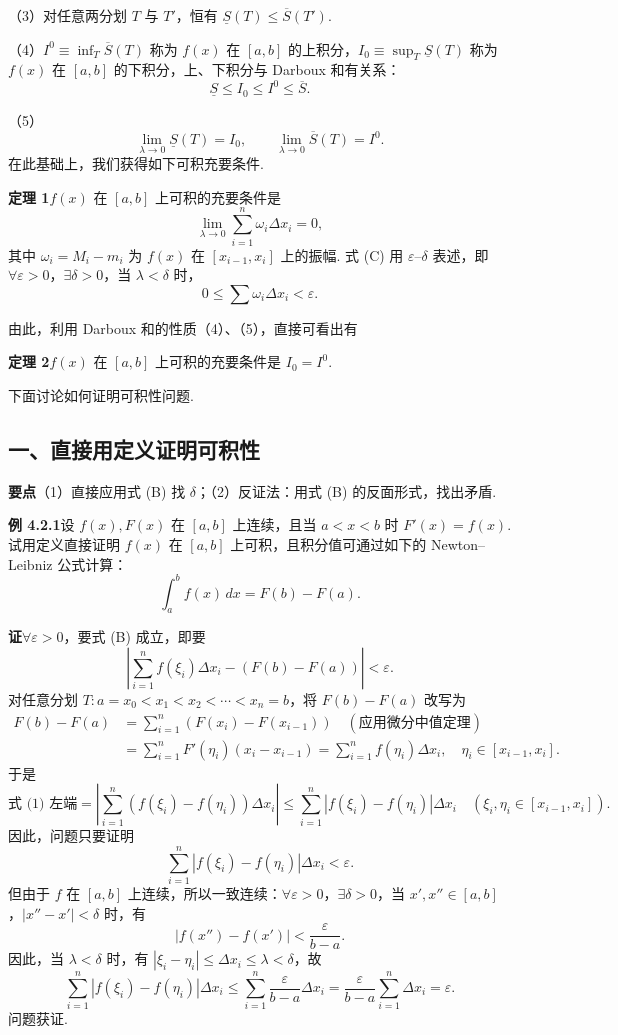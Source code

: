 \documentclass[UTF8,12pt,a4paper,fontset=fandol]{ctexart}
\begin{document}
（3）对任意两分划 $T$ 与 $T'$，恒有 $\underline S(T)\le\overline S(T')$.

（4）$I^0\equiv\inf_T\overline S(T)$ 称为 $f(x)$ 在 $[a,b]$ 的上积分，$I_0\equiv\sup_T\underline S(T)$ 称为 $f(x)$ 在 $[a,b]$ 的下积分，上、下积分与 Darboux 和有关系：
\[
\underline S\le I_0\le I^0\le\overline S.
\]

（5）
\[
\lim_{\lambda\to0}\underline S(T)=I_0,\qquad
\lim_{\lambda\to0}\overline S(T)=I^0.
\]
在此基础上，我们获得如下可积充要条件.

\noindent\textbf{定理 1}\quad $f(x)$ 在 $[a,b]$ 上可积的充要条件是
\[
\lim_{\lambda\to0}\sum_{i=1}^n\omega_i\Delta x_i=0,
\tag{C}
\]
其中 $\omega_i=M_i-m_i$ 为 $f(x)$ 在 $[x_{i-1},x_i]$ 上的振幅. 式 (C) 用 $\varepsilon$--$\delta$ 表述，即 $\forall\varepsilon>0$，$\exists\delta>0$，当 $\lambda<\delta$ 时，
\[
0\le\sum\omega_i\Delta x_i<\varepsilon.
\]

由此，利用 Darboux 和的性质（4）、（5），直接可看出有

\noindent\textbf{定理 2}\quad $f(x)$ 在 $[a,b]$ 上可积的充要条件是 $I_0=I^0$.

下面讨论如何证明可积性问题.

\subsection*{一、直接用定义证明可积性}

\noindent\textbf{要点}\quad （1）直接应用式 (B) 找 $\delta$；（2）反证法：用式 (B) 的反面形式，找出矛盾.

\noindent\textbf{例 4.2.1}\quad 设 $f(x),F(x)$ 在 $[a,b]$ 上连续，且当 $a<x<b$ 时 $F'(x)=f(x)$. 试用定义直接证明 $f(x)$ 在 $[a,b]$ 上可积，且积分值可通过如下的 Newton--Leibniz 公式计算：
\[
\int_a^b f(x)\,dx=F(b)-F(a).
\]

\noindent\textbf{证}\quad $\forall\varepsilon>0$，要式 (B) 成立，即要
\[
\left|\sum_{i=1}^n f(\xi_i)\Delta x_i-(F(b)-F(a))\right|<\varepsilon.
\tag{1}
\]
对任意分划 $T:a=x_0<x_1<x_2<\cdots<x_n=b$，将 $F(b)-F(a)$ 改写为
\[
\begin{aligned}
F(b)-F(a)
&=\sum_{i=1}^n(F(x_i)-F(x_{i-1}))\quad(\text{应用微分中值定理})\\
&=\sum_{i=1}^nF'(\eta_i)(x_i-x_{i-1})
=\sum_{i=1}^nf(\eta_i)\Delta x_i,\quad
\eta_i\in[x_{i-1},x_i].
\end{aligned}
\]
于是
\[
\text{式 (1) 左端}
=\left|\sum_{i=1}^n(f(\xi_i)-f(\eta_i))\Delta x_i\right|
\le\sum_{i=1}^n|f(\xi_i)-f(\eta_i)|\Delta x_i
\quad(\xi_i,\eta_i\in[x_{i-1},x_i]).
\]
因此，问题只要证明
\[
\sum_{i=1}^n|f(\xi_i)-f(\eta_i)|\Delta x_i<\varepsilon.
\tag{2}
\]
但由于 $f$ 在 $[a,b]$ 上连续，所以一致连续：$\forall\varepsilon>0$，$\exists\delta>0$，当 $x',x''\in[a,b]$，$|x''-x'|<\delta$ 时，有
\[
|f(x'')-f(x')|<\frac{\varepsilon}{b-a}.
\]
因此，当 $\lambda<\delta$ 时，有 $|\xi_i-\eta_i|\le\Delta x_i\le\lambda<\delta$，故
\[
\sum_{i=1}^n|f(\xi_i)-f(\eta_i)|\Delta x_i
\le\sum_{i=1}^n\frac{\varepsilon}{b-a}\Delta x_i
=\frac{\varepsilon}{b-a}\sum_{i=1}^n\Delta x_i=\varepsilon.
\]
问题获证.
\end{document}
